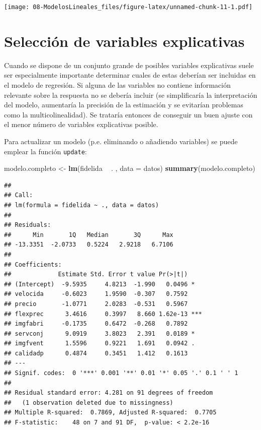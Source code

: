 \documentclass[]{book}
\newenvironment{Shaded}{\begin{snugshade}}{\end{snugshade}}
\newcommand{\DataTypeTok}[1]{\textcolor[rgb]{0.13,0.29,0.53}{#1}}
\newcommand{\KeywordTok}[1]{\textcolor[rgb]{0.13,0.29,0.53}{\textbf{#1}}}
\newcommand{\NormalTok}[1]{#1}
\newcommand{\OperatorTok}[1]{\textcolor[rgb]{0.81,0.36,0.00}{\textbf{#1}}}
\newcommand{\StringTok}[1]{\textcolor[rgb]{0.31,0.60,0.02}{#1}}
\begin{document}
\texttt{[image: 08-ModelosLineales\_files/figure-latex/unnamed-chunk-11-1.pdf]}

\hypertarget{seleccion-de-variables-explicativas}{%
\section{Selección de variables explicativas}\label{seleccion-de-variables-explicativas}}

Cuando se dispone de un conjunto grande de posibles variables explicativas
suele ser especialmente importante determinar cuales de estas deberían ser
incluidas en el modelo de regresión.
Si alguna de las variables no contiene información relevante sobre la respuesta
no se debería incluir (se simplificaría la interpretación del modelo, aumentaría
la precisión de la estimación y se evitarían problemas como la multicolinealidad).
Se trataría entonces de conseguir un buen ajuste con el menor número de variables explicativas posible.

Para actualizar un modelo (p.e. eliminando o añadiendo variables) se puede emplear la función \texttt{update}:

\begin{Shaded}
\begin{Highlighting}[]
\NormalTok{modelo.completo <-}\StringTok{ }\KeywordTok{lm}\NormalTok{(fidelida }\OperatorTok{~}\StringTok{ }\NormalTok{. , }\DataTypeTok{data =}\NormalTok{ datos)}
\KeywordTok{summary}\NormalTok{(modelo.completo)}
\end{Highlighting}
\end{Shaded}

\begin{verbatim}
## 
## Call:
## lm(formula = fidelida ~ ., data = datos)
## 
## Residuals:
##      Min       1Q   Median       3Q      Max 
## -13.3351  -2.0733   0.5224   2.9218   6.7106 
## 
## Coefficients:
##             Estimate Std. Error t value Pr(>|t|)    
## (Intercept)  -9.5935     4.8213  -1.990   0.0496 *  
## velocida     -0.6023     1.9590  -0.307   0.7592    
## precio       -1.0771     2.0283  -0.531   0.5967    
## flexprec      3.4616     0.3997   8.660 1.62e-13 ***
## imgfabri     -0.1735     0.6472  -0.268   0.7892    
## servconj      9.0919     3.8023   2.391   0.0189 *  
## imgfvent      1.5596     0.9221   1.691   0.0942 .  
## calidadp      0.4874     0.3451   1.412   0.1613    
## ---
## Signif. codes:  0 '***' 0.001 '**' 0.01 '*' 0.05 '.' 0.1 ' ' 1
## 
## Residual standard error: 4.281 on 91 degrees of freedom
##   (1 observation deleted due to missingness)
## Multiple R-squared:  0.7869, Adjusted R-squared:  0.7705 
## F-statistic:    48 on 7 and 91 DF,  p-value: < 2.2e-16
\end{verbatim}
\end{document}
